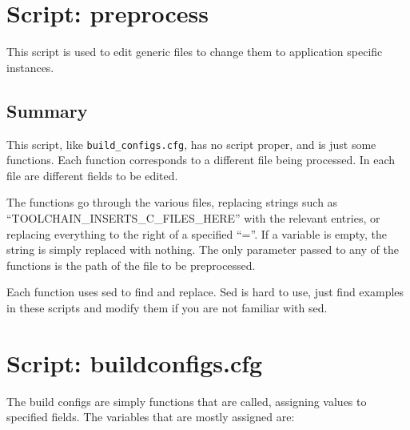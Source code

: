 \documentclass[a4paper, oneside, 11pt, titlepage, onecolumn, openright]{report}
\begin{document}
			
\section{Script: preprocess}
			\label{s:Preprocess}
			This script is used to edit generic files to change them to application specific instances.

\subsection{Summary}
			\label{ss:preprocessSummary}
			This script, like \texttt{build\_configs.cfg}, has no script proper, and is just some functions. Each function corresponds to a different file being processed. In each file are different fields to be edited. \newline
			
			The functions go through the various files, replacing strings such as ``TOOLCHAIN\_INSERTS\_C\_FILES\_HERE'' with the relevant entries, or replacing everything to the right of a specified ``=''. If a variable is empty, the string is simply replaced with nothing.\newline
			The only parameter passed to any of the functions is the path of the file to be preprocessed.\newline
			
			Each function uses sed to find and replace. Sed is hard to use, just find examples in these scripts and modify them if you are not familiar with sed.
			
\section{Script: buildconfigs.cfg}
			\label{s:buildConfigs}
			The build configs are simply functions that are called, assigning values to specified fields. The variables that are mostly assigned are:
			
\end{document}
